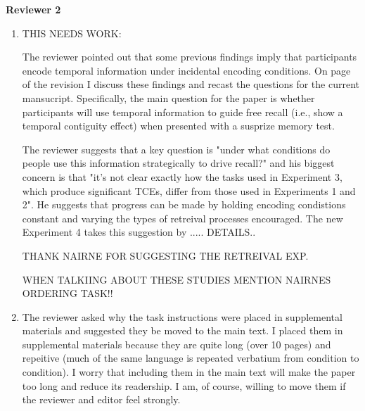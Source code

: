 \documentclass[12pt]{article}
\begin{document}
\textbf{\large{Reviewer 2}}

\begin{enumerate}

	\item 
	THIS NEEDS WORK:

	The reviewer pointed out that some previous findings imply that participants encode temporal information under incidental encoding conditions. On page \pageref{TODO-8} of the revision I discuss these findings and recast the questions for the current mansucript. Specifically, the main question for the paper is whether participants will use temporal information to guide free recall (i.e., show a temporal contiguity effect) when presented with a susprize memory test.

	The reviewer suggests that a key question is "under what conditions do people use this information strategically to drive recall?" and his biggest concern is that "it's not clear exactly how the tasks used in Experiment 3, which produce significant TCEs, differ from those used in Experiments 1 and 2". He suggests that progress can be made by holding encoding condistions constant and varying the types of retreival processes encouraged. The new Experiment 4 takes this suggestion by ..... DETAILS..

	THANK NAIRNE FOR SUGGESTING THE RETREIVAL EXP. 

	WHEN TALKIING ABOUT THESE STUDIES MENTION NAIRNES ORDERING TASK!!

	\item
	The reviewer asked why the task instructions were placed in supplemental materials and suggested they be moved to the main text. I placed them in supplemental materials because they are quite long (over 10 pages) and repeitive (much of the same language is repeated verbatium from condition to condition). I worry that including them in the main text will make the paper too long and reduce its readership. I am, of course, willing to move them if the reviewer and editor feel strongly.


\end{enumerate}
\end{document}
